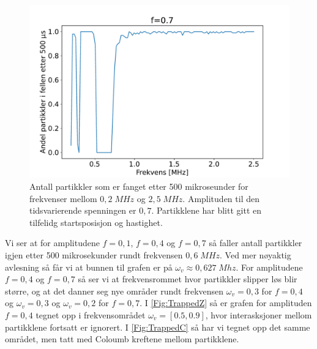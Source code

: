\documentclass[reprint,english,notitlepage, nofootinbib]{revtex4-1}  %
\begin{document}
\begin{figure}[H]
\centering
\includegraphics[scale=0.4]{../Images/2Trapped.pdf}
\caption{Antall partikkler som er fanget etter 500 mikroseunder for frekvenser mellom $0,2 \; MHz$ og $2,5 \; MHz$. Amplituden til den tidsvarierende spenningen er $0,7$. Partikklene har blitt gitt en tilfelidg startsposisjon og hastighet.}
\label{Fig:Trapped07}
\end{figure}

Vi ser at for amplitudene $f = 0,1$, $f = 0,4$ og $f=0,7$ så faller antall partikkler igjen etter 500 mikrosekunder rundt frekvensen $0,6 \; MHz$. Ved mer nøyaktig avlesning så får vi at bunnen til grafen er på $\omega_v \approx 0,627 \; Mhz$. For amplitudene $f=0,4$ og $f=0,7$ så ser vi at frekvensrommet hvor partikkler slipper løs blir større, og at det danner seg nye områder rundt frekvensen $\omega_v = 0,3$ for $f=0,4$ og $\omega_v = 0,3$ og $\omega_v=0,2$ for $f=0,7$. I \autoref{Fig:TrappedZ} så er grafen for amplituden $f = 0,4$ tegnet opp i frekvensområdet $\omega_v = [0.5, 0.9]$, hvor interasksjoner mellom partikklene fortsatt er ignorert. I \autoref{Fig:TrappedC} så har vi tegnet opp det samme området, men tatt med Coloumb kreftene mellom partikklene. 
\end{document}
